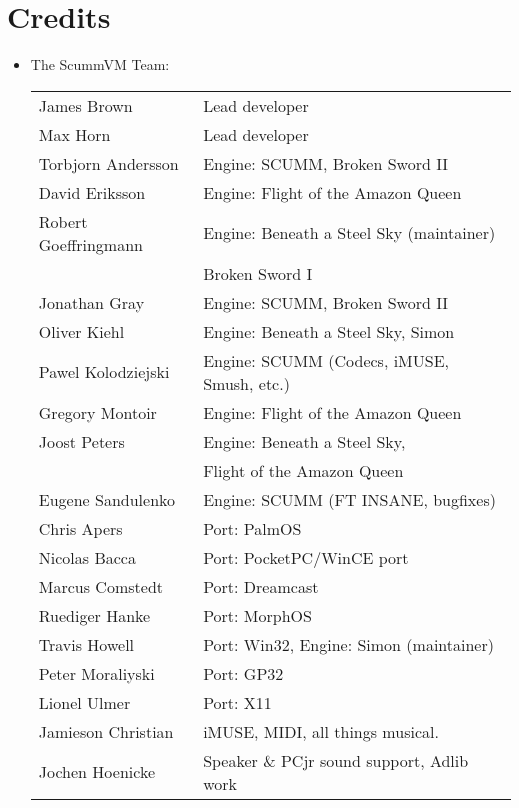 

\section{Credits}
\begin{itemize}
\item The ScummVM Team:\\
  \begin{tabular}[h]{ll}
    James Brown          & Lead developer\\
    Max Horn             & Lead developer\\
    Torbjorn Andersson   & Engine: SCUMM, Broken Sword II\\
    David Eriksson       & Engine: Flight of the Amazon Queen\\
    Robert Goeffringmann & Engine: Beneath a Steel Sky (maintainer)\\
    				& Broken Sword I\\
    Jonathan Gray        & Engine: SCUMM, Broken Sword II\\
    Oliver Kiehl         & Engine: Beneath a Steel Sky, Simon\\
    Pawel Kolodziejski   & Engine: SCUMM (Codecs, iMUSE, Smush, etc.)\\
    Gregory Montoir      & Engine: Flight of the Amazon Queen\\
    Joost Peters         & Engine: Beneath a Steel Sky,\\
                         &         Flight of the Amazon Queen\\
    Eugene Sandulenko    & Engine: SCUMM (FT INSANE, bugfixes)\\
    Chris Apers          & Port: PalmOS\\
    Nicolas Bacca        & Port: PocketPC/WinCE port\\
    Marcus Comstedt      & Port: Dreamcast\\
    Ruediger Hanke       & Port: MorphOS\\
    Travis Howell        & Port: Win32, Engine: Simon (maintainer)\\
    Peter Moraliyski     & Port: GP32\\
    Lionel Ulmer         & Port: X11\\
    Jamieson Christian   & iMUSE, MIDI, all things musical.\\
    Jochen Hoenicke      & Speaker \& PCjr sound support, Adlib work\\

\end{tabular}
\end{itemize}

